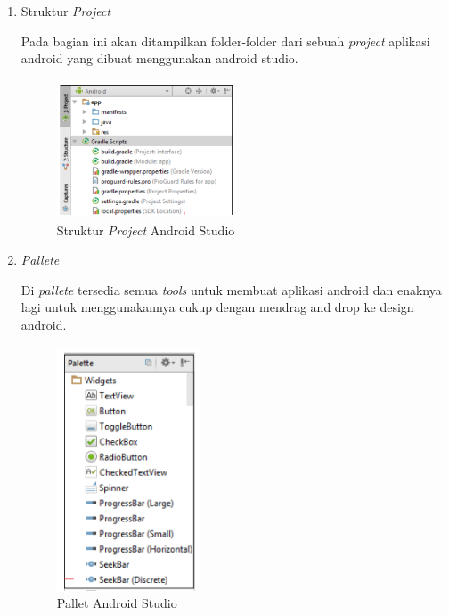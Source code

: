 \begin{enumerate}
    \\
    \\
    \\
    \\
    \item Struktur\textit{ Project}
    \par Pada bagian ini akan ditampilkan folder-folder dari sebuah \textit{project} aplikasi android yang dibuat menggunakan android studio.
    \begin{figure}[H]
    \centering
    \includegraphics[width=0.5\textwidth]{figures/android16.png}
    \caption{Struktur \textit{Project} Android Studio}
    \label{print}
    \end{figure}
    
    \item \textit{Pallete}
    \par Di\textit{ pallete} tersedia semua\textit{ tools} untuk membuat aplikasi android dan enaknya lagi untuk menggunakannya cukup dengan mendrag and drop ke design android.
    \begin{figure}[H]
    \centering
    \includegraphics[width=0.4\textwidth]{figures/android17.png}
    \caption{Pallet Android Studio}
    \label{print}
    \end{figure}
    

\end{enumerate}
